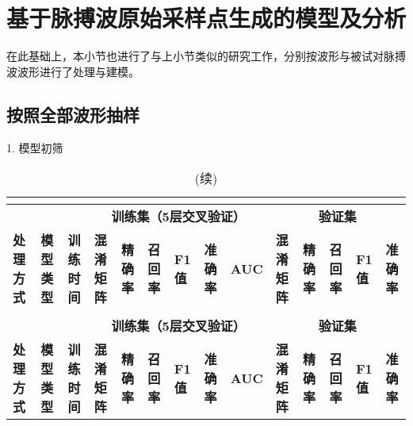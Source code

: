 \section{基于脉搏波原始采样点生成的模型及分析}

在此基础上，本小节也进行了与上小节类似的研究工作，分别按波形与被试对脉搏波波形进行了处理与建模。

\subsection{按照全部波形抽样}

1. 模型初筛

\begin{landscape}
      \begin{longtable}{m{1.5cm}<{\centering}m{1.5cm}<{\centering}m{1.5cm}<{\centering}m{2cm}<{\centering}m{1cm}<{\centering}m{1cm}<{\centering}m{1cm}<{\centering}m{1cm}<{\centering}m{1cm}<{\centering}m{2cm}<{\centering}m{1cm}<{\centering}m{1cm}<{\centering}m{1cm}<{\centering}m{1cm}<{\centering}}
            \caption{初筛结果}\\
            \label{tab:model_screen3}\\
            \toprule
                  & \multicolumn{1}{c}{}   & \multicolumn{1}{c}{}  & \multicolumn{6}{c}{\textbf{训练集（5层交叉验证）}}   & \multicolumn{5}{c}{\textbf{验证集}}     \\
            \multirow{-2}{*}{\textbf{处理方式}}  & \multicolumn{1}{c}{\multirow{-2}{*}{\textbf{模型类型}}} & \multicolumn{1}{c}{\multirow{-2}{*}{\textbf{训练时间}}} & \textbf{混淆矩阵} & \textbf{精确率} & \textbf{召回率}& \textbf{F1值} & \textbf{准确率}& \textbf{AUC} & \textbf{混淆矩阵}& \textbf{精确率} & \textbf{召回率} & \textbf{F1值}& \textbf{准确率} \\
            \midrule
            \endfirsthead
            \caption[]{(续)}\\
            \midrule
                  & \multicolumn{1}{c}{}   & \multicolumn{1}{c}{}  & \multicolumn{6}{c}{\textbf{训练集（5层交叉验证）}}   & \multicolumn{5}{c}{\textbf{验证集}}                                                                                                                                                                                                    \\
            \multirow{-2}{*}{\textbf{处理方式}}  & \multicolumn{1}{c}{\multirow{-2}{*}{\textbf{模型类型}}} & \multicolumn{1}{c}{\multirow{-2}{*}{\textbf{训练时间}}} & \textbf{混淆矩阵} & \textbf{精确率} & \textbf{召回率}& \textbf{F1值} & \textbf{准确率}& \textbf{AUC} & \textbf{混淆矩阵}& \textbf{精确率} & \textbf{召回率} & \textbf{F1值}& \textbf{准确率} \\

\end{longtable}
\end{landscape}
